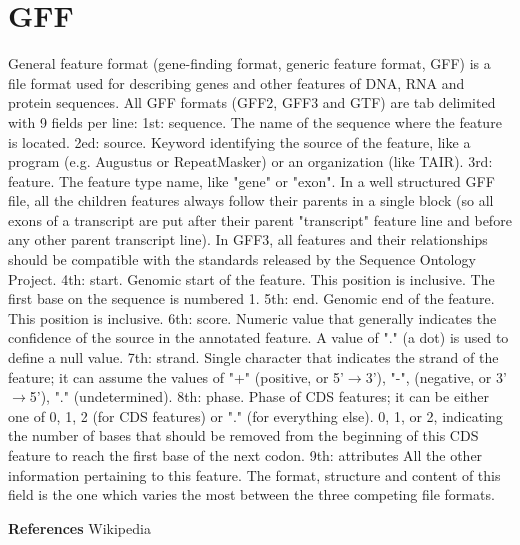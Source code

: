 \documentclass[11pt]{article}
\begin{document}
\section{GFF}
General feature format (gene-finding format, generic feature format, GFF) is a file format used for describing genes and other features of DNA, RNA and protein sequences. 
All GFF formats (GFF2, GFF3 and GTF) are tab delimited with 9 fields per line: 
\newline
1st: sequence. 
The name of the sequence where the feature is located.
\newline
2ed: source. 
Keyword identifying the source of the feature, like a program (e.g. Augustus or RepeatMasker) or an organization (like TAIR).
\newline
3rd: feature. 
The feature type name, like "gene" or "exon". 
In a well structured GFF file, all the children features always follow their parents in a single block (so all exons of a transcript are put after their parent "transcript" feature line and before any other parent transcript line). 
In GFF3, all features and their relationships should be compatible with the standards released by the Sequence Ontology Project.
\newline
4th: start. 
Genomic start of the feature. 
This position is inclusive. 
The first base on the sequence is numbered 1.
\newline
5th: end. 
Genomic end of the feature. 
This position is inclusive.
\newline
6th: score. 
Numeric value that generally indicates the confidence of the source in the annotated feature. 
A value of "." (a dot) is used to define a null value.
\newline
7th: strand. 
Single character that indicates the strand of the feature; 
it can assume the values of "+" (positive, or 5'$\rightarrow$3'), "-", (negative, or 3'$\rightarrow$5'), "." (undetermined).
\newline
8th: phase. 
Phase of CDS features; it can be either one of 0, 1, 2 (for CDS features) or "." (for everything else). 
0, 1, or 2, indicating the number of bases that should be removed from the beginning of this CDS feature to reach the first base of the next codon.
\newline
9th: attributes 
All the other information pertaining to this feature. 
The format, structure and content of this field is the one which varies the most between the three competing file formats.
 
\newpage
\textbf{References}
\newline
Wikipedia
\end{document}

